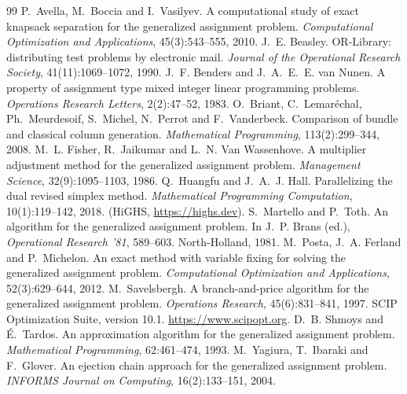 \documentclass[11pt,a4paper]{article}
\begin{document}
\begin{thebibliography}{99}
\small
\setlength{\itemsep}{0pt}
 P.~Avella, M.~Boccia and I.~Vasilyev. A computational study of exact knapsack
  separation for the generalized assignment problem. \emph{Computational Optimization and
  Applications}, 45(3):543--555, 2010.
 J.~E. Beasley. OR-Library: distributing test problems by electronic mail.
  \emph{Journal of the Operational Research Society}, 41(11):1069--1072, 1990.
 J.~F. Benders and J.~A.~E.~E. van Nunen. A property of assignment type mixed
  integer linear programming problems. \emph{Operations Research Letters}, 2(2):47--52, 1983.
 O.~Briant, C.~Lemaréchal, Ph.~Meurdesoif, S.~Michel, N.~Perrot and
  F.~Vanderbeck. Comparison of bundle and classical column generation. \emph{Mathematical
  Programming}, 113(2):299--344, 2008.
 M.~L. Fisher, R.~Jaikumar and L.~N. Van Wassenhove. A multiplier adjustment
  method for the generalized assignment problem. \emph{Management Science}, 32(9):1095--1103,
  1986.
 Q.~Huangfu and J.~A.~J. Hall. Parallelizing the dual revised simplex method.
  \emph{Mathematical Programming Computation}, 10(1):119--142, 2018. (HiGHS, \url{https://highs.dev}).
 S.~Martello and P.~Toth. An algorithm for the generalized assignment
  problem. In J.~P. Brans (ed.), \emph{Operational Research '81}, 589--603. North-Holland, 1981.
 M.~Posta, J.~A. Ferland and P.~Michelon. An exact method with variable fixing
  for solving the generalized assignment problem. \emph{Computational Optimization and
  Applications}, 52(3):629--644, 2012.
 M.~Savelsbergh. A branch-and-price algorithm for the generalized
  assignment problem. \emph{Operations Research}, 45(6):831--841, 1997.
 SCIP Optimization Suite, version 10.1. \url{https://www.scipopt.org}.
 D.~B. Shmoys and É.~Tardos. An approximation algorithm for the generalized
  assignment problem. \emph{Mathematical Programming}, 62:461--474, 1993.
 M.~Yagiura, T.~Ibaraki and F.~Glover. An ejection chain approach for the
  generalized assignment problem. \emph{INFORMS Journal on Computing}, 16(2):133--151, 2004.
\end{thebibliography}

\appendix
\end{document}
